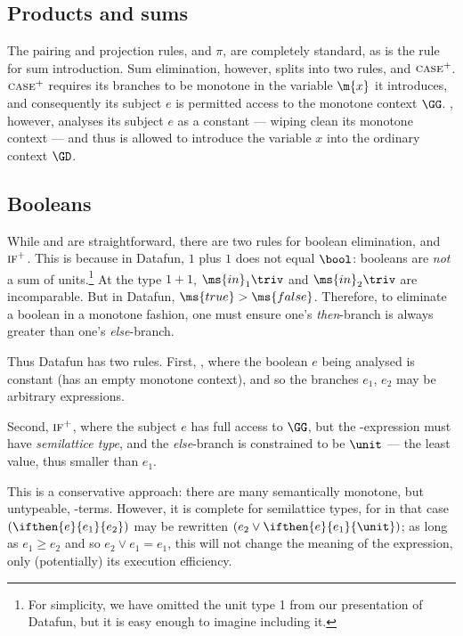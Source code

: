 

\subsection{Products and sums}
The pairing and projection rules,  and $\pi$, are completely standard,
as is the  rule for sum introduction. Sum elimination, however, splits
into two rules,  and $\textsc{case}^+$. $\textsc{case}^+$ requires its branches
to be monotone in the variable $\m{x}$ it introduces, and consequently its
subject $e$ is permitted access to the monotone context $\GG$. ,
however, analyses its subject $e$ as a constant --- wiping clean its monotone
context --- and thus is allowed to introduce the variable $x$ into the ordinary
context $\GD$. 

\subsection{Booleans}
\label{sec:typing-rules-booleans}

While  and  are straightforward, there are two rules for
boolean elimination,  and $\textsc{if}^+$. This is because in Datafun, $1$
plus $1$ does not equal $\bool$: booleans are \emph{not} a sum of
units.\footnote{For simplicity, we have omitted the unit type 1 from our
  presentation of Datafun, but it is easy enough to imagine including it.} At
the type $1 + 1$, $\ms{in}_1 \triv$ and $\ms{in}_2 \triv$ are incomparable. But
in Datafun, $\ms{true} > \ms{false}$. Therefore, to eliminate a boolean in a
monotone fashion, one must ensure one's \emph{then}-branch is always greater
than one's \emph{else}-branch.

Thus Datafun has two  rules. First, , where the boolean $e$ being
analysed is constant (has an empty monotone context), and so the branches $e_1$,
$e_2$ may be arbitrary expressions.

Second, $\textsc{if}^+$, where the subject $e$ has full access to $\GG$, but the
-expression must have \emph{semilattice type}, and the \emph{else}-branch
is constrained to be $\unit$ --- the least value, thus smaller than $e_1$.

This is a conservative approach: there are many semantically monotone, but
untypeable, -terms. However, it is complete for semilattice types, for in
that case $(\ifthen{e}{e_1}{e_2})$ may be rewritten $(e_2 \vee
\ifthen{e}{e_1}{\unit})$; as long as $e_1 \ge e_2$ and so $e_2 \vee e_1 = e_1$,
this will not change the meaning of the expression, only (potentially) its
execution efficiency.

